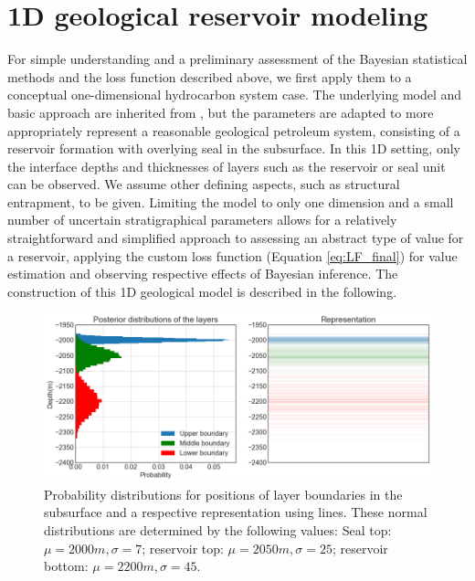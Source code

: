 		\section{1D geological reservoir modeling}\label{sec:1D_model}
		For simple understanding and a preliminary assessment of the Bayesian statistical methods and the loss function described above, we first apply them to a conceptual one-dimensional hydrocarbon system case. The underlying model and basic approach are inherited from \citet{delaVarga2016}, but the parameters are adapted to more appropriately represent a reasonable geological petroleum system, consisting of a reservoir formation with overlying seal in the subsurface. In this 1D setting, only the interface depths and thicknesses of layers such as the reservoir or seal unit can be observed. We assume other defining aspects, such as structural entrapment, to be given. Limiting the model to only one dimension and a small number of uncertain stratigraphical parameters allows for a relatively straightforward and simplified approach to assessing an abstract type of value for a reservoir, applying the custom loss function (Equation \ref{eq:LF_final}) for value estimation and observing respective effects of Bayesian inference. The construction of this 1D geological model is described in the following.
			\begin{figure}[h]
				\centering
				\includegraphics[width=1\textwidth]{Figures/1D_model.png}
				\caption{Probability distributions for positions of layer boundaries in the subsurface and a respective representation using lines. These normal distributions are determined by the following values: Seal top: $\mu = 2000 m, \sigma = 7$; reservoir top: $\mu = 2050 m, \sigma = 25$; reservoir bottom: $\mu = 2200 m, \sigma = 45$. }\label{fig:1D_model}
			\end{figure}
